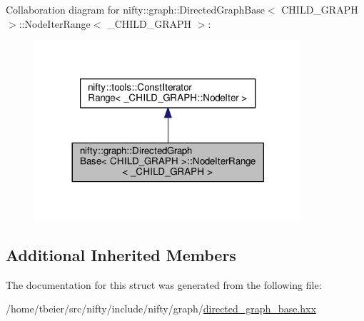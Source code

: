 Collaboration diagram for nifty\+:\+:graph\+:\+:Directed\+Graph\+Base$<$ C\+H\+I\+L\+D\+\_\+\+G\+R\+A\+P\+H $>$\+:\+:Node\+Iter\+Range$<$ \+\_\+\+C\+H\+I\+L\+D\+\_\+\+G\+R\+A\+P\+H $>$\+:\nopagebreak
\begin{figure}[H]
\begin{center}
\leavevmode
\includegraphics[width=281pt]{structnifty_1_1graph_1_1DirectedGraphBase_1_1NodeIterRange__coll__graph}
\end{center}
\end{figure}
\subsection*{Additional Inherited Members}


The documentation for this struct was generated from the following file\+:\begin{DoxyCompactItemize}
\item 
/home/tbeier/src/nifty/include/nifty/graph/\hyperlink{directed__graph__base_8hxx}{directed\+\_\+graph\+\_\+base.\+hxx}\end{DoxyCompactItemize}
